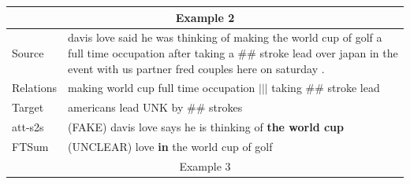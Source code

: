 \documentclass[letterpaper]{article} %
\begin{document}
\begin{table}[ht]
\begin{tabularx}{\linewidth}{p{1.2cm}|X}
			\multicolumn{2}{c}{Example 2}                                                                                                                                                                                              \\ \hline
			\multicolumn{1}{l|}{Source}    & davis love said he was thinking of making the world cup of golf a full time occupation after taking a \#\# stroke lead over japan in the event with us partner fred couples here on saturday .                                                    \\ \hline
			\multicolumn{1}{l|}{Relations} & making world cup full time occupation $|||$ taking \#\# stroke lead                                                                                                                       \\ \hline
			\multicolumn{1}{l|}{Target}    & americans lead UNK by \#\# strokes                                                                                                                                                        \\ \hline
			\multicolumn{1}{l|}{att-s2s}   & (FAKE) davis love says he is thinking of \textbf{the world cup }                                                                                                            \\ \hline
			\multicolumn{1}{l|}{FTSum}     & (UNCLEAR) love \textbf{in} the world cup of golf                                                                                                                            \\ \hline
			\multicolumn{2}{c}{Example 3}                                                                                                                                                                                              \\ \hline

\end{tabularx}
\end{table}
\end{document}
